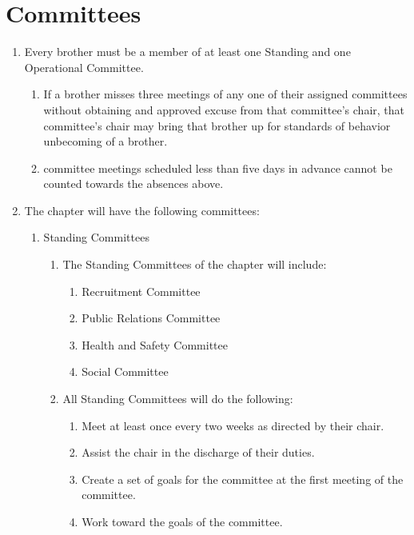 \section{Committees}
\label{committees}

\begin{enumerate}
	\item Every brother must be a member of at least one Standing and one Operational Committee.
    \begin{enumerate}
        \item If a brother misses three meetings of any one of their assigned committees without obtaining and approved excuse from that committee's chair, that committee's chair may bring that brother up for standards of behavior unbecoming of a brother.
        \item committee meetings scheduled less than five days in advance cannot be counted towards the absences above.
    \end{enumerate}
	\item The chapter will have the following committees:
		\begin{enumerate}
			\item Standing Committees \label{standing-comm}
				\begin{enumerate}
					\item The Standing Committees of the chapter will include:

						\begin{enumerate}
							\item Recruitment Committee
							\item Public Relations Committee
							\item Health and Safety Committee
							\item Social Committee
						\end{enumerate}

					\item All Standing Committees will do the following:
						\begin{enumerate}
							\item Meet at least once every two weeks as directed by their chair.
							\item Assist the chair in the discharge of their duties.
							\item Create a set of goals for the committee at the first meeting of the committee.
							\item Work toward the goals of the committee.
						\end{enumerate}
				\end{enumerate}


\end{enumerate}
\end{enumerate}
